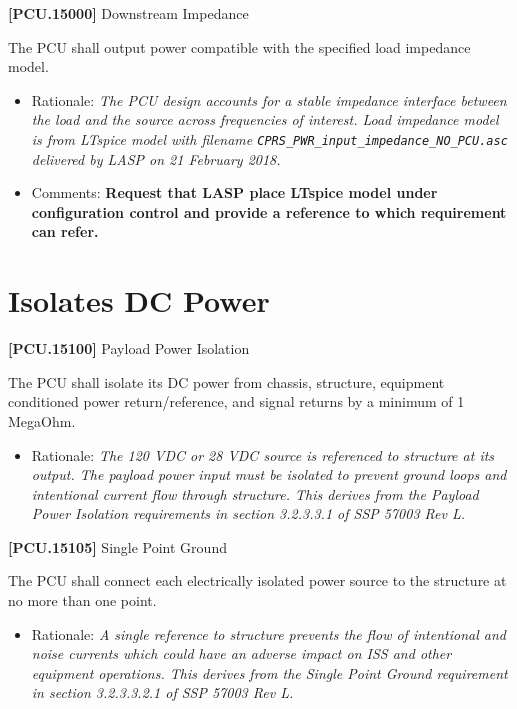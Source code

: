 \textbf{[PCU.15000]} Downstream Impedance

The \gls{PCU} shall output power compatible with the specified load impedance model.

\begin{itemize}
\item{} Rationale: \emph{The PCU design accounts for a stable impedance interface between the load and the source across frequencies of interest. Load impedance model is from LTspice model with filename \texttt{CPRS\_PWR\_input\_impedance\_NO\_PCU.asc} delivered by LASP on 21 February 2018.}

\item{} Comments: \textbf{Request that LASP place LTspice model under configuration control and provide a reference to which requirement can refer.}

\end{itemize}

\section{Isolates DC Power}
\label{isolatesdcpower}

\textbf{[PCU.15100]} Payload Power Isolation

The \gls{PCU} shall isolate its DC power from chassis, structure, equipment conditioned power return\slash reference, and signal returns by a minimum of 1 MegaOhm.

\begin{itemize}
\item{} Rationale: \emph{The 120 VDC or 28 VDC source is referenced to structure at its output. The payload power input must be isolated to prevent ground loops and intentional current flow through structure. This derives from the Payload Power Isolation requirements in section 3.2.3.3.1 of SSP 57003 Rev L.}

\end{itemize}

\textbf{[PCU.15105]} Single Point Ground

The \gls{PCU} shall connect each electrically isolated power source to the structure at no more than one point.

\begin{itemize}
\item{} Rationale: \emph{A single reference to structure prevents the flow of intentional and noise currents which could have an adverse impact on ISS and other equipment operations. This derives from the Single Point Ground requirement in section 3.2.3.3.2.1 of SSP 57003 Rev L.}

\end{itemize}

